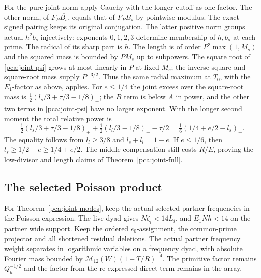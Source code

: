 For the pure joint norm apply Cauchy with the longer cutoff
as one factor. The other norm, of \(F_P\overline{B_s}\),
equals that of \(F_P B_s\) by pointwise modulus.
The exact signed pairing keeps its original conjugation.
The latter positive norm groups actual \(h^2 b_s\) injectively:
exponents \(0,1,2,3\) determine membership of \(h,b_s\)
at each prime. The radical of its sharp part is \(h\).
The length is of order \(P^2\max(1,M_s)\) and the squared
mass is bounded by \(P M_s\) up to subpowers. The square root
of \eqref{pca:joint-psi} grows at most linearly in \(P\)
at fixed \(M_s\); the inverse square and square-root mass
supply \(P^{-3/2}\). Thus the same radial maximum at
\(T_0\), with the \(E_1\)-factor as above, applies.
For \(e\le1/4\) the joint excess over the square-root mass
is \(\tfrac12(l_s/3+\tau/3-1/8)_+\); the \(B\) term is
below \(A\) in power, and the other two terms in
\eqref{pca:joint-psi} have no larger exponent.
With the longer second moment the total relative power is
\[
 \tfrac12(l_s/3+\tau/3-1/8)_+
 +\tfrac12(l_l/3-1/8)_+-\tau/2
     =\tfrac16(1/4+e/2-l_s)_+ .
\]
The equality follows from \(l_l\ge3/8\) and \(l_s+l_l=1-e\).
If \(e\le1/6\), then \(l_s\ge1/2-e\ge1/4+e/2\).
The middle compensation still costs \(R/E\), proving the
low-divisor and length claims of Theorem~\ref{pca:joint-full}.

\subsection{The selected Poisson product}
\label{pca:joint-selected-proof}

For Theorem~\ref{pca:joint-modes}, keep the actual selected
partner frequencies in the Poisson expression. The live dyad
gives \(N\zeta_i<14L_i\), and \(E_1Nh<14\) on the partner
wide support. Keep the ordered \(e_0\)-assignment, the
common-prime projector and all shortened residual deletions.
The actual partner frequency weight separates in logarithmic
variables on a frequency dyad, with absolute Fourier mass
bounded by \(\mathcal M_{12}(W)(1+T/R)^{-4}\).
The primitive factor remains \(Q_u^{-1/2}\) and the factor
from the re-expressed direct term remains in the array.

